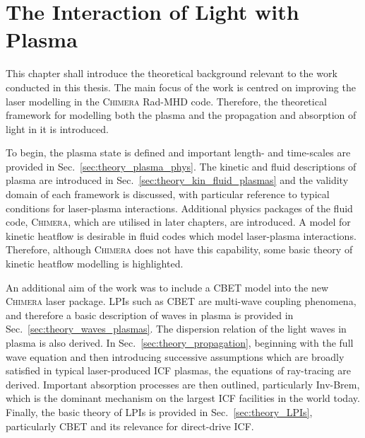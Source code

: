 \chapter{The Interaction of Light with Plasma}%
\label{chap:Theory}

This chapter shall introduce the theoretical background relevant to the work conducted in this thesis.
The main focus of the work is centred on improving the laser modelling in the \textsc{Chimera} \ac{Rad-MHD} code.
Therefore, the theoretical framework for modelling both the plasma and the propagation and absorption of light in it is introduced.

To begin, the plasma state is defined and important length- and time-scales are provided in Sec.~\ref{sec:theory_plasma_phys}.
The kinetic and fluid descriptions of plasma are introduced in Sec.~\ref{sec:theory_kin_fluid_plasmas} and the validity domain of each framework is discussed, with particular reference to typical conditions for laser-plasma interactions.
Additional physics packages of the fluid code, \textsc{Chimera}, which are utilised in later chapters, are introduced.
A model for kinetic heatflow is desirable in fluid codes which model laser-plasma interactions.
Therefore, although \textsc{Chimera} does not have this capability, some basic theory of kinetic heatflow modelling is highlighted.

An additional aim of the work was to include a \ac{CBET} model into the new \textsc{Chimera} laser package.
\ac{LPIs} such as \ac{CBET} are multi-wave coupling phenomena, and therefore a basic description of waves in plasma is provided in Sec.~\ref{sec:theory_waves_plasmas}.
The dispersion relation of the light waves in plasma is also derived.
In Sec.~\ref{sec:theory_propagation}, beginning with the full wave equation and then introducing successive assumptions which are broadly satisfied in typical laser-produced \ac{ICF} plasmas, the equations of ray-tracing are derived.
Important absorption processes are then outlined, particularly \ac{Inv-Brem}, which is the dominant mechanism on the largest \ac{ICF} facilities in the world today.
Finally, the basic theory of \ac{LPIs} is provided in Sec.~\ref{sec:theory_LPIs}, particularly \ac{CBET} and its relevance for direct-drive \ac{ICF}.

\newpage

